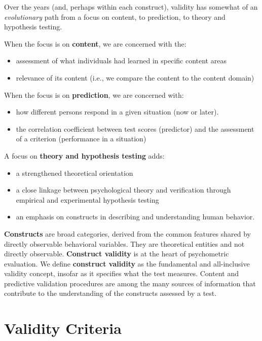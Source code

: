 \documentclass[
  english,
]{book}
\providecommand{\tightlist}{%
  \setlength{\itemsep}{0pt}\setlength{\parskip}{0pt}}
\begin{document}
Over the years (and, perhaps within each construct), validity has somewhat of an \emph{evolutionary} path from a focus on content, to prediction, to theory and hypothesis testing.

When the focus is on \textbf{content}, we are concerned with the:

\begin{itemize}
\tightlist
\item
  assessment of what individuals had learned in specific content areas
\item
  relevance of its content (i.e., we compare the content to the content domain)
\end{itemize}

When the focus is on \textbf{prediction}, we are concerned with:

\begin{itemize}
\tightlist
\item
  how different persons respond in a given situation (now or later).
\item
  the correlation coefficient between test scores (predictor) and the assessment of a criterion (performance in a situation)
\end{itemize}

A focus on \textbf{theory and hypothesis testing} adds:

\begin{itemize}
\tightlist
\item
  a strengthened theoretical orientation
\item
  a close linkage between psychological theory and verification through empirical and experimental hypothesis testing
\item
  an emphasis on constructs in describing and understanding human behavior.
\end{itemize}

\textbf{Constructs} are broad categories, derived from the common features shared by directly observable behavioral variables. They are theoretical entities and not directly observable. \textbf{Construct validity} is at the heart of psychometric evaluation. We define \textbf{construct validity} as the fundamental and all-inclusive validity concept, insofar as it specifies what the test measures. Content and predictive validation procedures are among the many sources of information that contribute to the understanding of the constructs assessed by a test.

\hypertarget{validity-criteria}{%
\section{Validity Criteria}\label{validity-criteria}}
\end{document}
